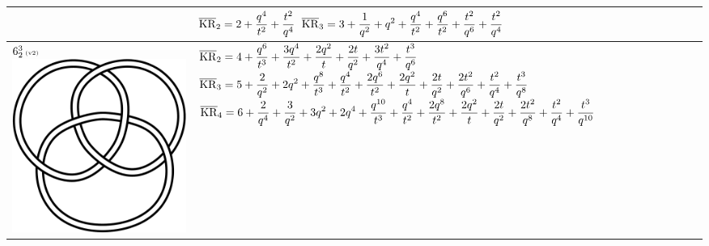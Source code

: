 \documentclass{compositio}
\theoremstyle{definition}
\numberwithin{equation}{section}
\begin{document}
{\begin{longtable}{p{}|p{}}
& 
\newline
$
\displaystyle{%
\overline{\KR}_{2} = 2+\frac{q^4}{t^2}+\frac{t^2}{q^4}
}
$
\newline 
$
\displaystyle{%
\overline{\KR}_{3} = 3+\frac{1}{q^2}+q^2+\frac{q^4}{t^2}+\frac{q^6}{t^2}+\frac{t^2}{q^6}+\frac{t^2}{q^4}
}
$
\newline
\\
\hline
$6_{2}^3\,\text{{\tiny (v2)}}$ 
\includegraphics[scale=0.07,angle=0]{link6_2_3.pdf} 
& 
\newline 
$
\displaystyle{%
\overline{\KR}_{2} = 4+\frac{q^6}{t^3}+\frac{3 q^4}{t^2}+\frac{2 q^2}{t}+\frac{2 t}{q^2}+\frac{3 t^2}{q^4}+\frac{t^3}{q^6}
}
$
\newline 
$
\displaystyle{%
\overline{\KR}_{3} = 5+\frac{2}{q^2}+2 q^2+\frac{q^8}{t^3}+\frac{q^4}{t^2}+\frac{2 q^6}{t^2}+\frac{2 q^2}{t}+\frac{2 t}{q^2}+\frac{2 t^2}{q^6}+\frac{t^2}{q^4}+\frac{t^3}{q^8}
}
$
\newline
$
\displaystyle{%
\overline{\KR}_{4} = 6+\frac{2}{q^4}+\frac{3}{q^2}+3 q^2+2 q^4+\frac{q^{10}}{t^3}+\frac{q^4}{t^2}+\frac{2 q^8}{t^2}+\frac{2 q^2}{t}+\frac{2 t}{q^2}+\frac{2 t^2}{q^8}+\frac{t^2}{q^4}+\frac{t^3}{q^{10}}
}
$
\newline 
\\
\hline

\end{longtable}}
\end{document}
